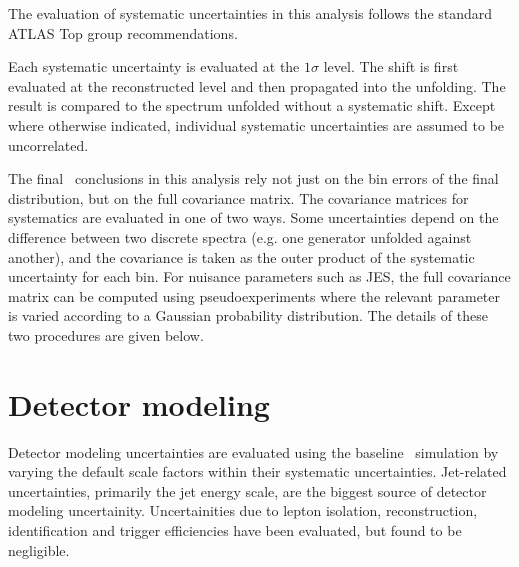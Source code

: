
The evaluation of systematic uncertainties in this analysis follows the standard ATLAS Top group recommendations.

Each systematic uncertainty is evaluated at the $1\sigma$ level. The shift is first evaluated at the reconstructed level and then propagated into the unfolding. The result is compared to the spectrum unfolded without a systematic shift. Except where otherwise indicated, individual systematic uncertainties are assumed to be uncorrelated. 

The final \chisq\ conclusions in this analysis rely not just on the bin errors of the final distribution, but on the full covariance matrix. The covariance matrices for systematics are evaluated in one of two ways. Some uncertainties depend on the difference between two discrete spectra (e.g. one generator unfolded against another), and the covariance is taken as the outer product of the systematic uncertainty for each bin. For nuisance parameters such as JES, the full covariance matrix can be computed using pseudoexperiments where the relevant parameter is varied according to a Gaussian probability distribution. The details of these two procedures are given below.

\section{Detector modeling}
Detector modeling uncertainties are evaluated using the baseline \ttbar\ simulation by varying the
default scale factors within their systematic uncertainties. Jet-related uncertainties, primarily the jet energy scale, are the biggest source of detector modeling uncertainity. Uncertainities due to lepton isolation, reconstruction, identification and trigger efficiencies have been evaluated, but found to be negligible. 


